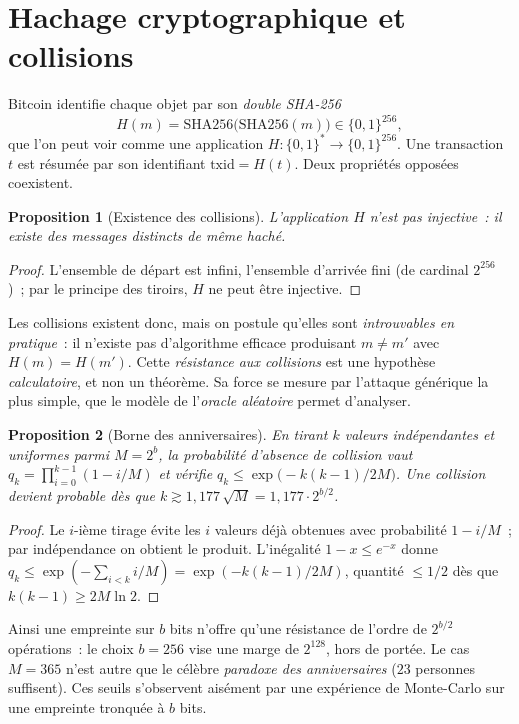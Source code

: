 \documentclass[11pt,a4paper]{article}
\theoremstyle{definition}\newtheorem{definition}{Définition}
\theoremstyle{plain}\newtheorem{theoreme}{Théorème}\newtheorem{proposition}{Proposition}
\theoremstyle{remark}\newtheorem{remarque}{Remarque}
\begin{document}
\section{Hachage cryptographique et collisions}

Bitcoin identifie chaque objet par son \emph{double SHA-256}
\[
  H(m) = \mathrm{SHA256}\bigl(\mathrm{SHA256}(m)\bigr) \in \{0,1\}^{256},
\]
que l'on peut voir comme une application $H:\{0,1\}^{*}\to\{0,1\}^{256}$. Une transaction $t$ est
résumée par son identifiant $\mathrm{txid}=H(t)$. Deux propriétés opposées coexistent.

\begin{proposition}[Existence des collisions]\label{prop:tiroirs}
L'application $H$ n'est pas injective~: il existe des messages distincts de même haché.
\end{proposition}
\begin{proof}
L'ensemble de départ est infini, l'ensemble d'arrivée fini (de cardinal $2^{256}$)~; par le
principe des tiroirs, $H$ ne peut être injective.
\end{proof}

Les collisions existent donc, mais on postule qu'elles sont \emph{introuvables en pratique}~: il
n'existe pas d'algorithme efficace produisant $m\neq m'$ avec $H(m)=H(m')$. Cette \emph{résistance
aux collisions} est une hypothèse \emph{calculatoire}, et non un théorème. Sa force se mesure par
l'attaque générique la plus simple, que le modèle de l'\emph{oracle aléatoire} permet d'analyser.

\begin{proposition}[Borne des anniversaires]\label{prop:birthday}
En tirant $k$ valeurs indépendantes et uniformes parmi $M=2^{b}$, la probabilité d'\emph{absence}
de collision vaut $q_k=\prod_{i=0}^{k-1}(1-i/M)$ et vérifie
$q_k\le \exp\!\bigl(-k(k-1)/2M\bigr)$. Une collision devient probable dès que
$k\gtrsim 1{,}177\,\sqrt{M}=1{,}177\cdot 2^{b/2}$.
\end{proposition}
\begin{proof}
Le $i$-ième tirage évite les $i$ valeurs déjà obtenues avec probabilité $1-i/M$~; par
indépendance on obtient le produit. L'inégalité $1-x\le e^{-x}$ donne
$q_k\le \exp(-\sum_{i<k} i/M)=\exp(-k(k-1)/2M)$, quantité $\le 1/2$ dès que $k(k-1)\ge 2M\ln 2$.
\end{proof}

Ainsi une empreinte sur $b$ bits n'offre qu'une résistance de l'ordre de $2^{b/2}$ opérations~:
le choix $b=256$ vise une marge de $2^{128}$, hors de portée. Le cas $M=365$ n'est autre que le
célèbre \emph{paradoxe des anniversaires} ($23$ personnes suffisent). Ces seuils s'observent
aisément par une expérience de Monte-Carlo sur une empreinte tronquée à $b$ bits.
\end{document}
